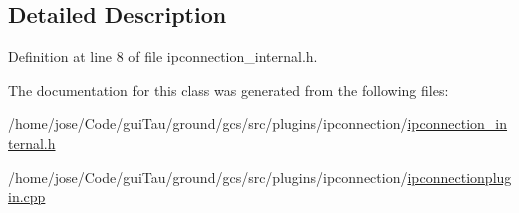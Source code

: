 \subsection{Detailed Description}


Definition at line 8 of file ipconnection\-\_\-internal.\-h.



The documentation for this class was generated from the following files\-:\begin{DoxyCompactItemize}
\item 
/home/jose/\-Code/gui\-Tau/ground/gcs/src/plugins/ipconnection/\hyperlink{ipconnection__internal_8h}{ipconnection\-\_\-internal.\-h}\item 
/home/jose/\-Code/gui\-Tau/ground/gcs/src/plugins/ipconnection/\hyperlink{ipconnectionplugin_8cpp}{ipconnectionplugin.\-cpp}\end{DoxyCompactItemize}
